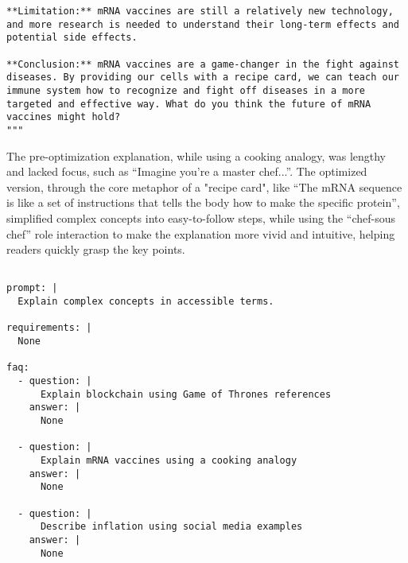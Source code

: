 \begin{tcolorbox}[title={\textbf{\small Performance After Optimization}}, boxrule=2pt, arc=0mm, breakable]
\begin{verbatim}
**Limitation:** mRNA vaccines are still a relatively new technology, and more research is needed to understand their long-term effects and potential side effects.

**Conclusion:** mRNA vaccines are a game-changer in the fight against diseases. By providing our cells with a recipe card, we can teach our immune system how to recognize and fight off diseases in a more targeted and effective way. What do you think the future of mRNA vaccines might hold?
"""

\end{verbatim}
\end{tcolorbox}


The pre-optimization explanation, while using a cooking analogy, was lengthy and lacked focus, such as ``Imagine you're a master chef...''. The optimized version, through the core metaphor of a "recipe card", like ``The mRNA sequence is like a set of instructions that tells the body how to make the specific protein'', simplified complex concepts into easy-to-follow steps, while using the ``chef-sous chef'' role interaction to make the explanation more vivid and intuitive, helping readers quickly grasp the key points.

\begin{tcolorbox}[title={\textbf{\small Iteration template on the BBH-navigate dataset}}, boxrule=2pt, arc=0mm, breakable]\begin{verbatim}

prompt: |
  Explain complex concepts in accessible terms.

requirements: |
  None

faq:
  - question: |
      Explain blockchain using Game of Thrones references
    answer: |
      None

  - question: |
      Explain mRNA vaccines using a cooking analogy
    answer: |
      None

  - question: |
      Describe inflation using social media examples
    answer: |
      None

\end{verbatim}
\end{tcolorbox}
